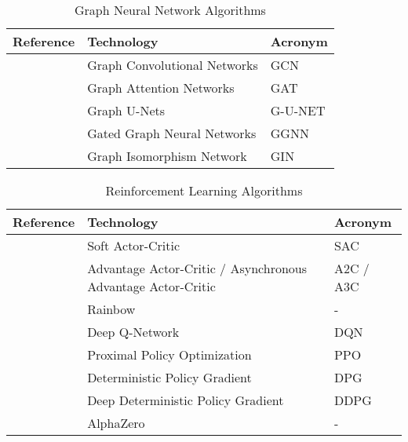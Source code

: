 \documentclass[11pt,a4paper]{article}
\begin{document}
\begin{table}[h!]
\centering
\caption{Graph Neural Network Algorithms}
\begin{tabular}{|P{2cm}|p{8cm}|P{2cm}|  } 
 \hline
 \textbf{Reference} & \textbf{Technology} & \textbf{Acronym} \\
 \hline
 \cite{kipfSemiSupervisedClassificationGraph2017} & Graph Convolutional Networks & GCN\\ \hline
 \cite{velickovicGraphAttentionNetworks2018} & Graph Attention Networks & GAT\\ \hline
\cite{gaoGraphUNets2019} & Graph U-Nets & G-U-NET \\ \hline
\cite{liGatedGraphSequence2016} & Gated Graph Neural Networks & GGNN \\ \hline
\cite{xuHowPowerfulAre2019} & Graph Isomorphism Network & GIN \\ \hline
\end{tabular}
\end{table}

\begin{table}[h!]
\centering
\caption{Reinforcement Learning Algorithms}
\begin{tabular}{|P{2cm}|p{8cm}|P{2cm}|  }
 \hline
 \textbf{Reference} & \textbf{Technology} & \textbf{Acronym} \\
 \hline
 \cite{haarnojaSoftActorCriticOffPolicy2018} & Soft Actor-Critic & SAC \\ \hline
\cite{mnihAsynchronousMethodsDeep2016a} & Advantage Actor-Critic / Asynchronous Advantage Actor-Critic & A2C / A3C \\ \hline
\cite{hesselRainbowCombiningImprovements2018} & Rainbow & - \\ \hline
\cite{mnihHumanlevelControlDeep2015} & Deep Q-Network & DQN \\ \hline
\cite{schulmanProximalPolicyOptimization2017} & Proximal Policy Optimization & PPO \\ \hline
\cite{silverDeterministicPolicyGradient} & Deterministic Policy Gradient & DPG \\ \hline
\cite{lillicrapContinuousControlDeep2019} & Deep Deterministic Policy Gradient & DDPG \\ \hline
\cite{silverMasteringChessShogi2017} & AlphaZero & - \\ \hline

 \hline

\end{tabular}
\end{table}
\end{document}
